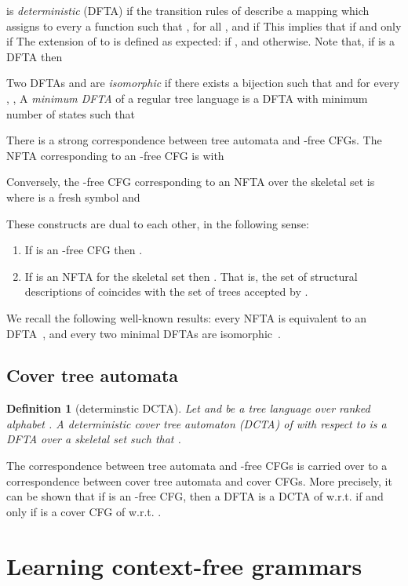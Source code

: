 \documentclass[preprint,12pt,english]{article}
\newtheorem{definition}{Definition}
\begin{document}
 is {\em deterministic} (DFTA) if the transition rules of  describe a mapping  which assigns to every  a function  such that
,  for all , and 
  if 
This implies that  if and only if  The  extension  of  to  is defined as expected:  if , and  otherwise. Note that, if  is a DFTA then 

Two DFTAs  and  are {\em isomorphic} if there exists a bijection  such that  and for every , ,  A {\em minimum DFTA} of a regular tree language  is a DFTA  with minimum number of states such that 

There is a strong correspondence between tree automata and -free CFGs.
The NFTA corresponding to an -free CFG  is  with 

Conversely, the -free CFG corresponding to an NFTA  over the skeletal set  is  where  is a fresh symbol and 

These  constructs are dual to each other, in the following sense:
\begin{enumerate}
\item[] If  is an -free CFG then . \hfill \cite[Prop. 3.4]{Sak:1990}
\item[] If  is an NFTA for the skeletal set  then . That is, the set of structural descriptions of  coincides with the set of trees accepted by . \hfill\cite[Prop. 3.6]{Sak:1990}
\end{enumerate}
We recall the following well-known results: 
every NFTA is equivalent to an DFTA~\cite{LJ:1978}, and every two minimal DFTAs are isomorphic~\cite{Brainerd:68}.

\subsection*{Cover tree automata}

\begin{definition}[determinstic DCTA]
Let  and  be a tree language over ranked alphabet .
A {\em deterministic cover tree automaton} (DCTA) of   with respect to  is a DFTA  over a skeletal set  such that . 
\end{definition}
The correspondence between tree automata and -free CFGs is carried over to a  correspondence between cover tree automata and cover CFGs. More precisely, it can be shown that if  is an -free CFG, then a DFTA  is a DCTA of  w.r.t.  if and only if  is a cover CFG of  w.r.t. .

\section{Learning context-free grammars}
\end{document}
